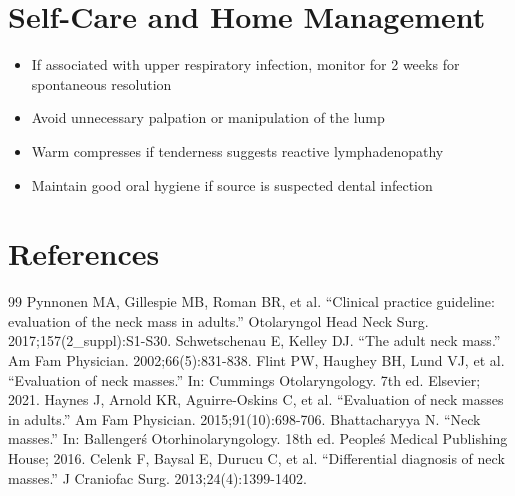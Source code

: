 \section*{Self-Care and Home Management}
\begin{itemize}
  \item If associated with upper respiratory infection, monitor for 2 weeks for spontaneous resolution
  \item Avoid unnecessary palpation or manipulation of the lump
  \item Warm compresses if tenderness suggests reactive lymphadenopathy
  \item Maintain good oral hygiene if source is suspected dental infection
\end{itemize}

\section*{References}
\begin{thebibliography}{99}
 Pynnonen MA, Gillespie MB, Roman BR, et al. ``Clinical practice guideline: evaluation of the neck mass in adults.'' Otolaryngol Head Neck Surg. 2017;157(2\_suppl):S1-S30.
 Schwetschenau E, Kelley DJ. ``The adult neck mass.'' Am Fam Physician. 2002;66(5):831-838.
 Flint PW, Haughey BH, Lund VJ, et al. ``Evaluation of neck masses.'' In: Cummings Otolaryngology. 7th ed. Elsevier; 2021.
 Haynes J, Arnold KR, Aguirre-Oskins C, et al. ``Evaluation of neck masses in adults.'' Am Fam Physician. 2015;91(10):698-706.
 Bhattacharyya N. ``Neck masses.'' In: Ballenger\'s Otorhinolaryngology. 18th ed. People\'s Medical Publishing House; 2016.
 Celenk F, Baysal E, Durucu C, et al. ``Differential diagnosis of neck masses.'' J Craniofac Surg. 2013;24(4):1399-1402.
\end{thebibliography}
